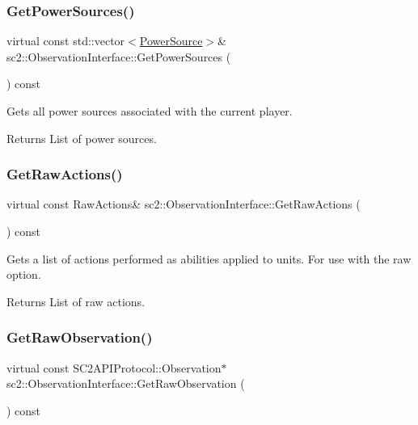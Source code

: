 \subsubsection{\texorpdfstring{Get\+Power\+Sources()}{GetPowerSources()}}
{\footnotesize\ttfamily virtual const std\+::vector$<$\hyperlink{structsc2_1_1_power_source}{Power\+Source}$>$\& sc2\+::\+Observation\+Interface\+::\+Get\+Power\+Sources (\begin{DoxyParamCaption}{ }\end{DoxyParamCaption}) const\hspace{0.3cm}{\ttfamily [pure virtual]}}

Gets all power sources associated with the current player. \begin{DoxyReturn}{Returns}
List of power sources. 
\end{DoxyReturn}
\mbox{\label{classsc2_1_1_observation_interface_aa247d650d50d3d1bfe81642df96b1360}} 
\subsubsection{\texorpdfstring{Get\+Raw\+Actions()}{GetRawActions()}}
{\footnotesize\ttfamily virtual const Raw\+Actions\& sc2\+::\+Observation\+Interface\+::\+Get\+Raw\+Actions (\begin{DoxyParamCaption}{ }\end{DoxyParamCaption}) const\hspace{0.3cm}{\ttfamily [pure virtual]}}

Gets a list of actions performed as abilities applied to units. For use with the raw option. \begin{DoxyReturn}{Returns}
List of raw actions. 
\end{DoxyReturn}
\mbox{\label{classsc2_1_1_observation_interface_a375edbd0639c948d8c83bdcd4ebd4932}} 
\subsubsection{\texorpdfstring{Get\+Raw\+Observation()}{GetRawObservation()}}
{\footnotesize\ttfamily virtual const S\+C2\+A\+P\+I\+Protocol\+::\+Observation$\ast$ sc2\+::\+Observation\+Interface\+::\+Get\+Raw\+Observation (\begin{DoxyParamCaption}{ }\end{DoxyParamCaption}) const\hspace{0.3cm}{\ttfamily [pure virtual]}}



